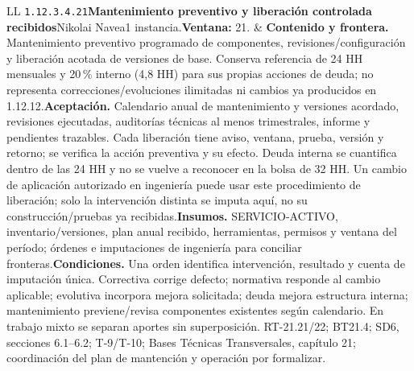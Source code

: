 \begin{longtable}{L{\tabcolsep\relax}L{\tabcolsep\relax}}
\texttt{1.\allowbreak{}12.\allowbreak{}3.\allowbreak{}4.\allowbreak{}21}\newline{}\textbf{Mantenimiento preventivo y liberación controlada recibidos}\newline{}Nikolai Navea\newline{}1 instancia.\newline{}\textbf{Ventana:} 21. & \textbf{Contenido y frontera.} Mantenimiento preventivo programado de componentes, revisiones/configuración y liberación acotada de versiones de base. Conserva referencia de 24 HH mensuales y 20\,\% interno (4,8 HH) para sus propias acciones de deuda; no representa correcciones/evoluciones ilimitadas ni cambios ya producidos en 1.12.12.\newline{}\textbf{Aceptación.} Calendario anual de mantenimiento y versiones acordado, revisiones ejecutadas, auditorías técnicas al menos trimestrales, informe y pendientes trazables. Cada liberación tiene aviso, ventana, prueba, versión y retorno; se verifica la acción preventiva y su efecto. Deuda interna se cuantifica dentro de las 24 HH y no se vuelve a reconocer en la bolsa de 32 HH. Un cambio de aplicación autorizado en ingeniería puede usar este procedimiento de liberación; solo la intervención distinta se imputa aquí, no su construcción/pruebas ya recibidas.\newline{}\textbf{Insumos.} SERVICIO-ACTIVO, inventario/versiones, plan anual recibido, herramientas, permisos y ventana del período; órdenes e imputaciones de ingeniería para conciliar fronteras.\newline{}\textbf{Condiciones.} Una orden identifica intervención, resultado y cuenta de imputación única. Correctiva corrige defecto; normativa responde al cambio aplicable; evolutiva incorpora mejora solicitada; deuda mejora estructura interna; mantenimiento previene/revisa componentes existentes según calendario. En trabajo mixto se separan aportes sin superposición. RT-21.21/22; BT21.4; SD6, secciones 6.1--6.2; T-9/T-10; Bases Técnicas Transversales, capítulo 21; coordinación del plan de mantención y operación por formalizar.\\\hline

\end{longtable}

